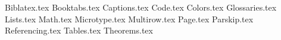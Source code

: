 {Biblatex.tex}
{Booktabs.tex}
{Captions.tex}
{Code.tex}
{Colors.tex}
{Glossaries.tex}
{Lists.tex}
{Math.tex}
{Microtype.tex}
{Multirow.tex}
{Page.tex}
{Parskip.tex}
{Referencing.tex}
{Tables.tex}
{Theorems.tex}
\usepackage[english]{babel}
\usepackage{csquotes}
\usepackage{expl3}
\usepackage{fontspec}
\usepackage{graphicx}
\usepackage{keyval}
\usepackage{url}
\usepackage{xparse}
\usepackage{blindtext}
\usepackage{datetime2}
\usepackage{float}
\usepackage{algorithm}
\usepackage{algpseudocode}
\usepackage{kbordermatrix}
